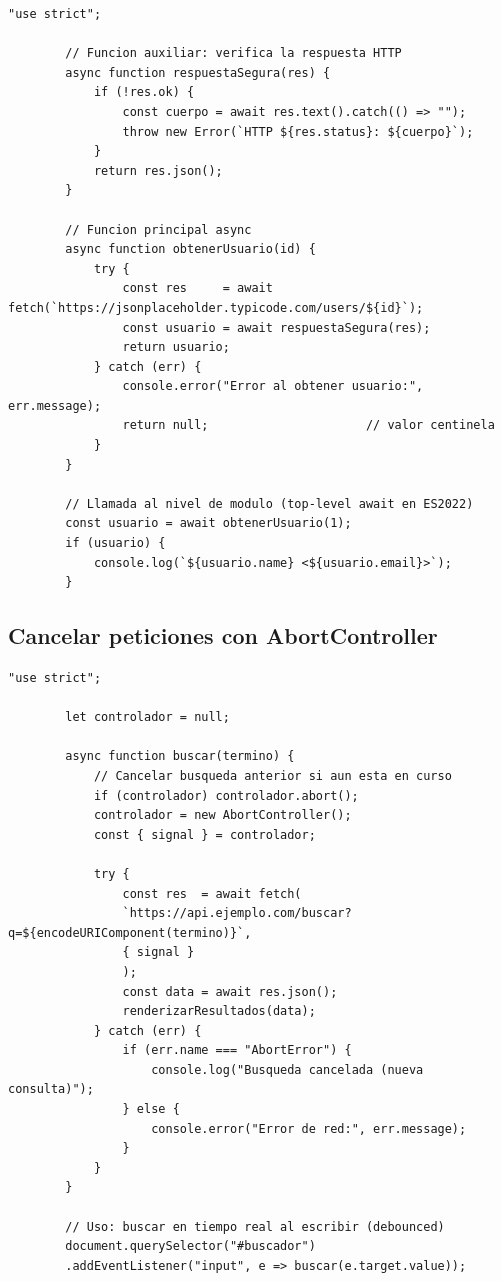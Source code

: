 \documentclass[11pt,a4paper,openany]{book}
\begin{document}
	\begin{lstlisting}[style=js,caption={\texttt{async}/\texttt{await} con manejo de errores},
		label=lst:4.16]
		"use strict";
		
		// Funcion auxiliar: verifica la respuesta HTTP
		async function respuestaSegura(res) {
			if (!res.ok) {
				const cuerpo = await res.text().catch(() => "");
				throw new Error(`HTTP ${res.status}: ${cuerpo}`);
			}
			return res.json();
		}
		
		// Funcion principal async
		async function obtenerUsuario(id) {
			try {
				const res     = await fetch(`https://jsonplaceholder.typicode.com/users/${id}`);
				const usuario = await respuestaSegura(res);
				return usuario;
			} catch (err) {
				console.error("Error al obtener usuario:", err.message);
				return null;                      // valor centinela
			}
		}
		
		// Llamada al nivel de modulo (top-level await en ES2022)
		const usuario = await obtenerUsuario(1);
		if (usuario) {
			console.log(`${usuario.name} <${usuario.email}>`);
		}
	\end{lstlisting}
	
	\subsection{Cancelar peticiones con AbortController}
	\label{sub:4.abort}
	
	\begin{lstlisting}[style=js,numbers=none,caption={Cancelar fetch con AbortController},
		label=lst:4.17]
		"use strict";
		
		let controlador = null;
		
		async function buscar(termino) {
			// Cancelar busqueda anterior si aun esta en curso
			if (controlador) controlador.abort();
			controlador = new AbortController();
			const { signal } = controlador;
			
			try {
				const res  = await fetch(
				`https://api.ejemplo.com/buscar?q=${encodeURIComponent(termino)}`,
				{ signal }
				);
				const data = await res.json();
				renderizarResultados(data);
			} catch (err) {
				if (err.name === "AbortError") {
					console.log("Busqueda cancelada (nueva consulta)");
				} else {
					console.error("Error de red:", err.message);
				}
			}
		}
		
		// Uso: buscar en tiempo real al escribir (debounced)
		document.querySelector("#buscador")
		.addEventListener("input", e => buscar(e.target.value));
	\end{lstlisting}
	
\end{document}
